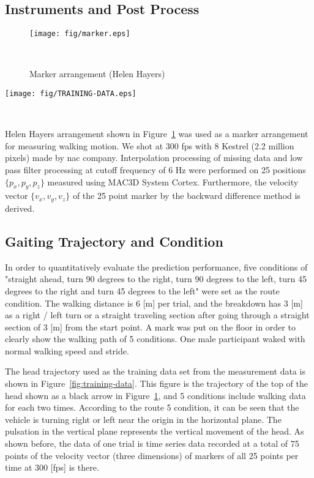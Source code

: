 \documentclass{sigchi}
\begin{document}
\subsection{Instruments and Post Process}

\begin{figure}
\centering
  \texttt{[image: fig/marker.eps]}
  \caption{Marker arrangement (Helen Hayers)}~ \label{fig:marker}
\end{figure}

\begin{figure*}
\centering
  \texttt{[image: fig/TRAINING-DATA.eps]}
  \caption{Parietal marker (appeared in Figure~\ref{fig:marker} black arrow) locus of learning data group}~ 
    \label{fig:training-data}
\end{figure*}

Helen Hayers arrangement shown in Figure~\ref{fig:marker} was used as a marker arrangement for measuring walking motion. We shot at 300 fps with 8 Kestrel (2.2 million pixels) made by nac company. Interpolation processing of missing data and low pass filter processing at cutoff frequency of 6 Hz were performed on 25 positions $\{p_x, p_y, p_z \}$ measured using MAC3D System Cortex. Furthermore, the velocity vector $ \{v_x, v_y, v_z \} $ of the 25 point marker by the backward difference method is derived.


\subsection{Gaiting Trajectory and Condition}

In order to quantitatively evaluate the prediction performance, five conditions of "straight ahead, turn 90 degrees to the right, turn 90 degrees to the left, turn 45 degrees to the right and turn 45 degrees to the left" were set as the route condition. The walking distance is 6 [m] per trial, and the breakdown has 3 [m] as a right / left turn or a straight traveling section after going through a straight section of 3 [m] from the start point. A mark was put on the floor  in order to clearly show the walking path of 5 conditions. One male participant waked with normal walking speed and stride.

The head trajectory used as the training data set from the measurement data is shown in Figure~\ref{fig:training-data}. This figure is the trajectory of the top of the head shown as a black arrow in Figure~\ref{fig:marker}, and 5 conditions include walking data for each two times. According to the route 5 condition, it can be seen that the vehicle is turning right or left near the origin in the horizontal plane. The pulsation in the vertical plane represents the vertical movement of the head. As shown before, the data of one trial is time series data recorded at a total of 75 points of the velocity vector (three dimensions) of markers of all 25 points per time at 300 [fps] is there.
\end{document}
